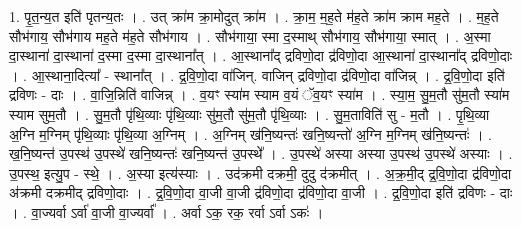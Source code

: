 \documentclass[17pt]{extarticle}
\begin{document}
1. पृ॒त॒न्य॒त इति॑ पृतन्य॒तः । . उत् क्रा॑म क्रा॒मोदुत् क्रा॑म । . क्रा॒म॒ म॒ह॒ते म॑ह॒ते क्रा॑म क्राम मह॒ते । . म॒ह॒ते सौभ॑गाय॒ सौभ॑गाय मह॒ते म॑ह॒ते सौभ॑गाय । . सौभ॑गाया॒ स्मा द॒स्माथ् सौभ॑गाय॒ सौभ॑गाया॒ स्मात् । . अ॒स्मा दा॒स्थाना॑ दा॒स्थाना॑ द॒स्मा द॒स्मा दा॒स्थाना᳚त् । . आ॒स्थाना᳚द् द्रविणो॒दा द्र॑विणो॒दा आ॒स्थाना॑ दा॒स्थाना᳚द् द्रविणो॒दाः । . आ॒स्थाना॒दित्या᳚ - स्थाना᳚त् । . द्र॒वि॒णो॒दा वा॑जिन्. वाजिन् द्रविणो॒दा द्र॑विणो॒दा वा॑जिन्न् । . द्र॒वि॒णो॒दा इति॑ द्रविणः - दाः । . वा॒जि॒न्निति॑ वाजिन्न् । . व॒यꣳ स्या॑म स्याम व॒यं ॅव॒यꣳ स्या॑म । . स्या॒म॒ सु॒म॒तौ सु॑म॒तौ स्या॑म स्याम सुम॒तौ । . सु॒म॒तौ पृ॑थि॒व्याः पृ॑थि॒व्याः सु॑म॒तौ सु॑म॒तौ पृ॑थि॒व्याः । . सु॒म॒ताविति॑ सु - म॒तौ । . पृ॒थि॒व्या अ॒ग्नि म॒ग्निम् पृ॑थि॒व्याः पृ॑थि॒व्या अ॒ग्निम् । . अ॒ग्निम् ख॑नि॒ष्यन्तः॑ खनि॒ष्यन्तो॑ अ॒ग्नि म॒ग्निम् ख॑नि॒ष्यन्तः॑ । . ख॒नि॒ष्यन्त॑ उ॒पस्थ॑ उ॒पस्थे॑ खनि॒ष्यन्तः॑ खनि॒ष्यन्त॑ उ॒पस्थे᳚ । . उ॒पस्थे॑ अस्या अस्या उ॒पस्थ॑ उ॒पस्थे॑ अस्याः । . उ॒पस्थ॒ इत्यु॒प - स्थे॒ । . अ॒स्या इत्य॑स्याः । . उद॑क्रमी दक्रमी॒ दुदु द॑क्रमीत् । . अ॒क्र॒मी॒द् द्र॒वि॒णो॒दा द्र॑विणो॒दा अ॑क्रमी दक्रमीद् द्रविणो॒दाः । . द्र॒वि॒णो॒दा वा॒जी वा॒जी द्र॑विणो॒दा द्र॑विणो॒दा वा॒जी । . द्र॒वि॒णो॒दा इति॑ द्रविणः - दाः । . वा॒ज्यर्वा ऽर्वा॑ वा॒जी वा॒ज्यर्वा᳚ । . अर्वा ऽक॒ रक॒ रर्वा ऽर्वा ऽकः॑ । \newline
\end{document}

